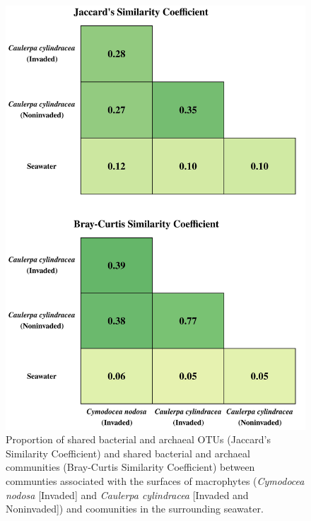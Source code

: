 \documentclass[12pt,]{article}
\begin{document}
\begin{figure}[H]

{\centering \includegraphics[width=0.7\linewidth]{../results/figures/matrix} 

}

\caption{Proportion of shared bacterial and archaeal OTUs (Jaccard's Similarity Coefficient) and shared bacterial and archaeal communities (Bray-Curtis Similarity Coefficient) between communties associated with the surfaces of macrophytes (\textit{Cymodocea nodosa} [Invaded] and \textit{Caulerpa cylindracea} [Invaded and Noninvaded]) and coomunities in the surrounding seawater.\label{matrix}}\label{fig:unnamed-chunk-1}
\end{figure}
\end{document}
